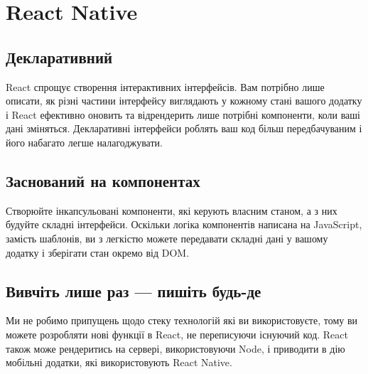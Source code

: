 \chapter{React Native}
\label{ch1}

\section{Декларативний}
\label{section.2.1}

React спрощує створення інтерактивних інтерфейсів.
Вам потрібно лише описати, як різні частини інтерфейсу виглядають у кожному стані вашого додатку і React ефективно оновить та відрендерить лише потрібні компоненти, коли ваші дані зміняться.
Декларативні інтерфейси роблять ваш код більш передбачуваним і його набагато легше налагоджувати.

\section{Заснований на компонентах}
\label{section.2.2}
Створюйте інкапсульовані компоненти, які керують власним станом, а з них будуйте складні інтерфейси.
Оскільки логіка компонентів написана на JavaScript, замість шаблонів, ви з легкістю можете передавати складні дані у вашому додатку і зберігати стан окремо від DOM.

\section{Вивчіть лише раз — пишіть будь-де}
\label{section.2.3}
Ми не робимо припущень щодо стеку технологій які ви використовуєте, тому ви можете розробляти нові функції в React, не переписуючи існуючий код.
React також може рендеритись на сервері, використовуючи Node, і приводити в дію мобільні додатки, які використовують React Native.
